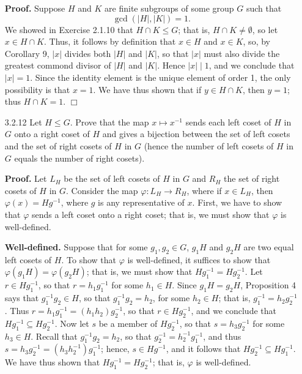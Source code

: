 \documentclass[9pt]{article}
\newcommand{\qed}{\hfill \ensuremath{\Box}}
\begin{document}
\begin{enumerate}
      \textbf{Proof.} Suppose $H$ and $K$ are finite subgroups of some group $G$
      such that
      $$\gcd(|H|, |K|) = 1.$$
      We showed in Exercise 2.1.10 that $H \cap K \le G$; that is,
      $H \cap K \neq \emptyset$, so let $x \in H \cap K$. Thus, it follows
      by  definition that $x \in H$ and $x \in K$, so, by Corollary 9, $|x|$ divides both $|H|$ and $|K|$, so that $|x|$ must 
      also divide the greatest commond divisor of $|H|$ and $|K|$. Hence
      $|x| \mid 1$, and we conclude that $|x| = 1$. Since the identity element 
      is the unique element of order 1, the only possibility is that $x = 1$. We
      have thus shown that if $y \in H \cap K$, then $y = 1$; thus $H \cap K = 1$. \qed
   \item[3.2.12]  Let $H \le G$. Prove that the map $x \mapsto x^{-1}$ sends
                  each left coset of $H$ in $G$ onto a right coset of $H$ and
                  gives a bijection between the set of left cosets and the set
                  of right cosets of $H$ in $G$ (hence the number of left cosets
                  of $H$ in $G$ equals the number of right cosets).

      \textbf{Proof.} Let $L_H$ be the set of left cosets of $H$ in $G$ and
      $R_H$ the set of right cosets of $H$ in $G$. Consider the map
      $\varphi : L_H \rightarrow R_H$, where if $x \in L_H$, then
      $\varphi(x) = Hg^{-1}$, where $g$ is any representative of $x$. First, we
      have to show that $\varphi$ sends a left coset onto a right coset; that
      is, we must show that $\varphi$ is well-defined.
      
      \textbf{Well-defined.} Suppose that for some $g_1, g_2 \in G$, $g_1H$ and
      $g_2H$ are two equal left cosets of $H$. To show that $\varphi$ is
      well-defined, it suffices to show that $\varphi(g_1H) = \varphi(g_2H)$;
      that is, we must show that $Hg_1^{-1} = Hg_2^{-1}$. Let $r \in Hg_1^{-1}$,
      so that $r = h_1g_1^{-1}$ for some $h_1 \in H$. Since $g_1H = g_2H$,
      Proposition 4 says that $g_1^{-1}g_2 \in H$, so that $g_1^{-1}g_2 = h_2$,
      for some $h_2 \in H$; that is, $g_1^{-1} = h_2g_2^{-1}$. Thus
      $r = h_1g_1^{-1} = (h_1h_2)g_2^{-1}$, so that $r \in Hg_2^{-1}$, and we
      conclude that $Hg_1^{-1} \subseteq Hg_2^{-1}$. Now let $s$ be a member
      of $Hg_2^{-1}$, so that $s = h_3g_2^{-1}$ for some $h_3 \in H$. Recall
      that $g_1^{-1}g_2 = h_2$, so that $g_2^{-1} = h_2^{-1}g_1^{-1}$, and thus
      $s = h_3g_2^{-1} = (h_3h_2^{-1})g_1^{-1}$; hence, $s \in Hg^{-1}$, and it
      follows  that $Hg_2^{-1} \subseteq Hg_1^{-1}$. We have thus shown that
      $Hg_1^{-1} = Hg_2^{-1}$; that is, $\varphi$ is well-defined.
      

\end{enumerate}
\end{document}
